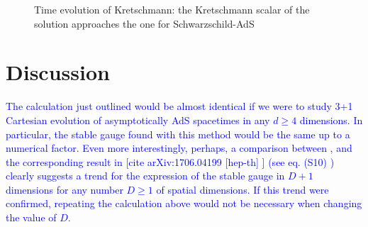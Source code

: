 \documentclass[12pt]{iopart} %
\begin{document}
\begin{figure}%
    \centering
    \qquad
    \caption{Time evolution of Kretschmann: the Kretschmann scalar of the solution approaches the one for Schwarzschild-AdS}%
    \label{fig:example}%
\end{figure}




\section{Discussion}\label{sec:Discussion}

\textcolor{blue}{The calculation just outlined would be almost identical if we were to study 3+1 Cartesian evolution of asymptotically AdS spacetimes in any $d\geq4$ dimensions. In particular, the stable gauge found with this method would be the same up to a numerical factor. Even more interestingly, perhaps, a comparison between , and the corresponding result in [cite arXiv:1706.04199 [hep-th] ] (see eq. (S10) ) clearly suggests a trend for the expression of the stable gauge in $D+1$ dimensions for any number $D\geq1$ of spatial dimensions. If this trend were confirmed, repeating the calculation above would not be necessary when changing the value of $D$.}
\end{document}
